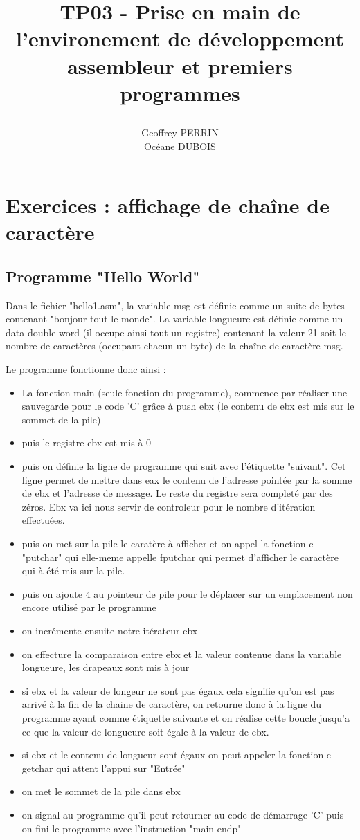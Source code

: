 \documentclass[11pt]{report}
\title{\textbf{TP03 - Prise en main de l'environement de développement assembleur et premiers programmes }
\author{Geoffrey PERRIN \\ Océane DUBOIS\\}
\date{}}
\begin{document}
\maketitle

\newpage

\section{Exercices : affichage de chaîne de caractère}

\subsection{Programme "Hello World"}

Dans le fichier "hello1.asm", la variable msg est définie comme un suite de bytes contenant "bonjour tout le monde".
La variable longueure est définie comme un data double word (il occupe ainsi tout un registre) contenant la valeur 21 soit le nombre de caractères (occupant chacun un byte) de la chaîne de caractère msg.

Le programme fonctionne donc ainsi :
\begin{itemize}
\item La fonction main (seule fonction du programme), commence par réaliser une sauvegarde pour le code 'C' grâce à push ebx (le contenu de ebx est mis sur le sommet de la pile)
\item puis le registre ebx est mis à 0
\item puis on définie la ligne de programme qui suit avec l'étiquette "suivant". Cet ligne permet de mettre dans eax le contenu de l'adresse pointée par la somme de ebx et l'adresse de message. Le reste du registre sera completé par des zéros. Ebx va ici nous servir de controleur pour le nombre d'itération effectuées.
\item puis on met sur la pile le caratère à afficher et on appel la fonction c "putchar" qui elle-meme appelle fputchar qui permet d'afficher le caractère qui à été mis sur la pile.
\item puis on ajoute 4 au pointeur de pile pour le déplacer sur un emplacement non encore utilisé par le programme
\item on incrémente ensuite notre itérateur ebx
\item on effecture la comparaison entre ebx et la valeur contenue dans la variable longueure, les drapeaux sont mis à jour
\item si ebx et la valeur de longeur ne sont pas égaux cela signifie qu'on est pas arrivé à la fin de la chaine de caractère, on retourne donc à la ligne du programme ayant comme étiquette suivante et on réalise cette boucle jusqu'a ce que la valeur de longueure soit égale à la valeur de ebx.
\item si ebx et le contenu de longueur sont égaux on peut appeler la fonction c getchar qui attent l'appui sur "Entrée"
\item on met le sommet de la pile dans ebx
\item on signal au programme qu'il peut retourner au code de démarrage 'C' puis on fini le programme avec l'instruction "main endp"

\end{itemize}
\end{document}
